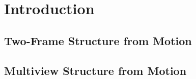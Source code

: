 \chapter{Introduction}

	\section{Two-Frame Structure from Motion}
	
	\section{Multiview Structure from Motion}